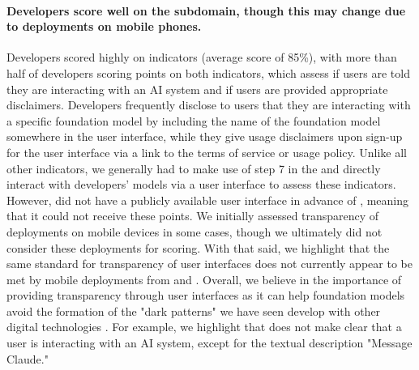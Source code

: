 \paragraph{Developers score well on the \interface subdomain, though this may change due to deployments on mobile phones.}
Developers scored highly on \interface indicators (average score of 85\%), with more than half of developers scoring points on both indicators, which assess if users are told they are interacting with an AI system and if users are provided appropriate disclaimers. 
Developers frequently disclose to users that they are interacting with a specific foundation model by including the name of the foundation model somewhere in the user interface, while they give usage disclaimers upon sign-up for the user interface via a link to the terms of service or usage policy. 
Unlike all other indicators, we generally had to make use of step 7 in the and directly interact with developers' models via a user interface to assess these indicators. 
However, \amazon did not have a publicly available user interface in advance of \informationfreezedate, meaning that it could not receive these points. 
We initially assessed transparency of deployments on mobile devices in some cases, though we ultimately did not consider these deployments for scoring.
With that said, we highlight that the same standard for transparency of user interfaces does not currently appear to be met by mobile deployments from \openai and \inflection.
Overall, we believe in the importance of providing transparency through user interfaces as it can help foundation models avoid the formation of the "dark patterns" we have seen develop with other digital technologies \citep{10.1145/3359183}.
For example, we highlight that \anthropic does not make clear that a user is interacting with an AI system, except for the textual description "Message Claude."

